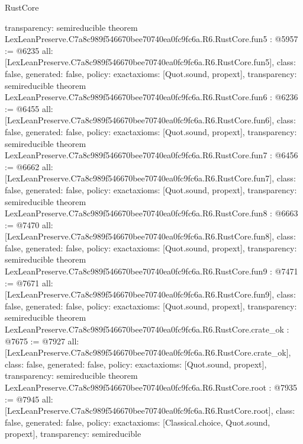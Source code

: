 \begin{lexlean}{RustCore}
\begin{coremodule}
{  transparency: semireducible
}
theorem LexLeanPreserve.C7a8c989f546670bee70740ea0fc9fc6a.R6.RustCore.fun5 : @5957 := @6235 {
  all: [LexLeanPreserve.C7a8c989f546670bee70740ea0fc9fc6a.R6.RustCore.fun5],
  class: false,
  generated: false,
  policy: exact{axioms: [Quot.sound, propext]},
  transparency: semireducible
}
theorem LexLeanPreserve.C7a8c989f546670bee70740ea0fc9fc6a.R6.RustCore.fun6 : @6236 := @6455 {
  all: [LexLeanPreserve.C7a8c989f546670bee70740ea0fc9fc6a.R6.RustCore.fun6],
  class: false,
  generated: false,
  policy: exact{axioms: [Quot.sound, propext]},
  transparency: semireducible
}
theorem LexLeanPreserve.C7a8c989f546670bee70740ea0fc9fc6a.R6.RustCore.fun7 : @6456 := @6662 {
  all: [LexLeanPreserve.C7a8c989f546670bee70740ea0fc9fc6a.R6.RustCore.fun7],
  class: false,
  generated: false,
  policy: exact{axioms: [Quot.sound, propext]},
  transparency: semireducible
}
theorem LexLeanPreserve.C7a8c989f546670bee70740ea0fc9fc6a.R6.RustCore.fun8 : @6663 := @7470 {
  all: [LexLeanPreserve.C7a8c989f546670bee70740ea0fc9fc6a.R6.RustCore.fun8],
  class: false,
  generated: false,
  policy: exact{axioms: [Quot.sound, propext]},
  transparency: semireducible
}
theorem LexLeanPreserve.C7a8c989f546670bee70740ea0fc9fc6a.R6.RustCore.fun9 : @7471 := @7671 {
  all: [LexLeanPreserve.C7a8c989f546670bee70740ea0fc9fc6a.R6.RustCore.fun9],
  class: false,
  generated: false,
  policy: exact{axioms: [Quot.sound, propext]},
  transparency: semireducible
}
theorem LexLeanPreserve.C7a8c989f546670bee70740ea0fc9fc6a.R6.RustCore.crate_ok : @7675 := @7927 {
  all: [LexLeanPreserve.C7a8c989f546670bee70740ea0fc9fc6a.R6.RustCore.crate_ok],
  class: false,
  generated: false,
  policy: exact{axioms: [Quot.sound, propext]},
  transparency: semireducible
}
theorem LexLeanPreserve.C7a8c989f546670bee70740ea0fc9fc6a.R6.RustCore.root : @7935 := @7945 {
  all: [LexLeanPreserve.C7a8c989f546670bee70740ea0fc9fc6a.R6.RustCore.root],
  class: false,
  generated: false,
  policy: exact{axioms: [Classical.choice, Quot.sound, propext]},
  transparency: semireducible
}


\end{coremodule}
\end{lexlean}
